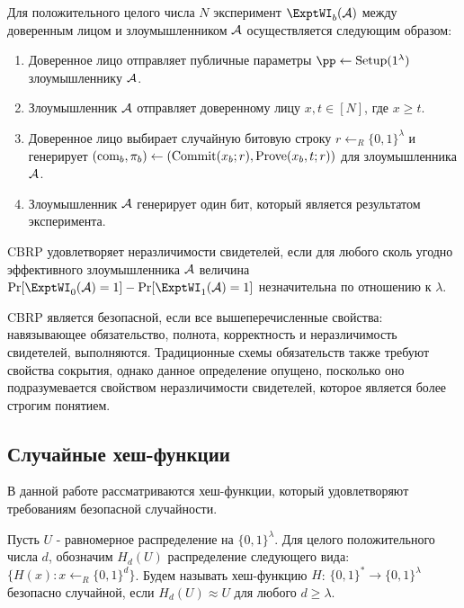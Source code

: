 \begin{definition}[$\ExptWI$]
	Для положительного целого числа $N$ эксперимент $\ExptWI_b(\A)$ между доверенным лицом и злоумышленником $\mathcal{A}$ осуществляется следующим образом:
	\begin{enumerate}
		\item Доверенное лицо отправляет публичные параметры $\pp \leftarrow \Setup(1^\lambda)$ злоумышленнику $\mathcal{A}$.
		\item Злоумышленник $\mathcal{A}$ отправляет доверенному лицу $x, t \in [N]$, где $x \geq t$.
		\item Доверенное лицо выбирает случайную битовую строку $r \leftarrow_R \{0, 1\}^\lambda$ и генерирует $(\text{com}_b, \pi_b) \leftarrow (\text{Commit}(x_b; r), \text{Prove}(x_b, t; r))$ для злоумышленника $\mathcal{A}$.
		\item Злоумышленник $\mathcal{A}$ генерирует один бит, который является результатом эксперимента.
	\end{enumerate}
\end{definition}

\begin{definition}
	CBRP удовлетворяет неразличимости свидетелей, если для любого сколь угодно эффективного злоумышленника $\mathcal{A}$ величина $\Pr[\ExptWI_0(\A) = 1] - \Pr[\ExptWI_1(\A)=1]$ незначительна по отношению к $\lambda$.
\end{definition}

CBRP является безопасной, если все вышеперечисленные свойства: навязывающее обязательство, полнота, корректность и неразличимость свидетелей, выполняются.
Традиционные схемы обязательств также требуют свойства сокрытия, однако данное определение опущено, посколько оно подразумевается свойством неразличимости свидетелей, которое является более строгим понятием.

\subsection{Случайные хеш-функции} %
В данной работе рассматриваются хеш-функции, который удовлетворяют требованиям безопасной случайности.

\begin{definition}
	Пусть $U$ - равномерное распределение на $\{0, 1\}^\lambda$.
	Для целого положительного числа $d$, обозначим $H_d(U)$ распределение следующего вида: $\{H(x): x \leftarrow_R \{0, 1\}^d\}$.
	Будем называть хеш-функцию $H$: $\{0, 1\}^* \rightarrow \{0, 1\}^\lambda$ безопасно случайной, если $H_d(U) \approx U$ для любого $d \geq \lambda$.
\end{definition}

